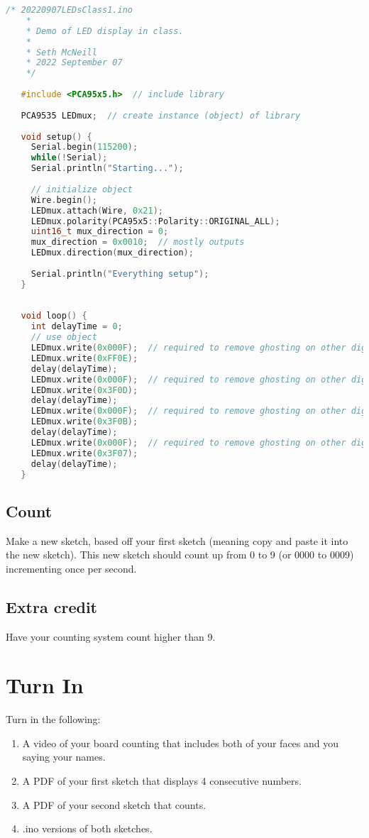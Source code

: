 \begin{lstlisting}[language=C++, caption={This listing is a starting point for driving the LED display. This sketch may also be available on Canvas.},label={lst:leddispstart}]
    /* 20220907LEDsClass1.ino
    *  
    * Demo of LED display in class.
    * 
    * Seth McNeill
    * 2022 September 07
    */
   
   #include <PCA95x5.h>  // include library
   
   PCA9535 LEDmux;  // create instance (object) of library
   
   void setup() {
     Serial.begin(115200);
     while(!Serial);
     Serial.println("Starting...");
   
     // initialize object
     Wire.begin();
     LEDmux.attach(Wire, 0x21);
     LEDmux.polarity(PCA95x5::Polarity::ORIGINAL_ALL);
     uint16_t mux_direction = 0;
     mux_direction = 0x0010;  // mostly outputs
     LEDmux.direction(mux_direction);
   
     Serial.println("Everything setup");
   }
   
   
   void loop() {
     int delayTime = 0;
     // use object
     LEDmux.write(0x000F);  // required to remove ghosting on other digits
     LEDmux.write(0xFF0E);
     delay(delayTime); 
     LEDmux.write(0x000F);  // required to remove ghosting on other digits
     LEDmux.write(0x3F0D);
     delay(delayTime); 
     LEDmux.write(0x000F);  // required to remove ghosting on other digits
     LEDmux.write(0x3F0B);
     delay(delayTime); 
     LEDmux.write(0x000F);  // required to remove ghosting on other digits
     LEDmux.write(0x3F07);
     delay(delayTime); 
   }
\end{lstlisting}
    
\subsection{Count}
Make a new sketch, based off your first sketch (meaning copy and paste it into the new sketch).
This new sketch should count up from 0 to 9 (or 0000 to 0009) incrementing once per second. 

\subsection{Extra credit}
Have your counting system count higher than 9.

\section{Turn In}
Turn in the following:
\begin{enumerate}
    \item A video of your board counting that includes both of your faces and you saying your names.
    \item A PDF of your first sketch that displays 4 consecutive numbers.
    \item A PDF of your second sketch that counts.
    \item .ino versions of both sketches.
\end{enumerate}
